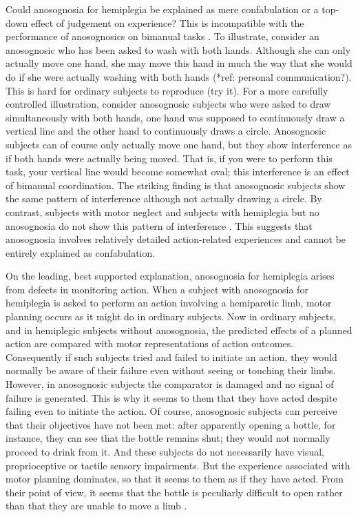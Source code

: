 \documentclass[12pt,\papersize]{extarticle}
\begin{document}
Could anosognosia for hemiplegia be explained as mere  confabulation or a top-down effect of judgement on experience?  This is incompatible with the performance of anosognosics on bimanual tasks \citep{berti:2008_motor, garbarini:2012_moving}.  To illustrate, consider an anosognosic who has been asked to wash with both hands.  Although she can only actually move one hand, she may move this hand in much the way that she would do if she were actually washing with both hands (*ref: personal communication?).  This is hard for ordinary subjects to reproduce (try it). For a more carefully controlled illustration, consider anosognosic subjects who were asked to draw simultaneously with both hands, one hand was supposed to continuously draw a vertical line and the other hand to continuously draws a circle.  Anosognosic subjects can of course only actually move one hand, but they show interference as if both hands were actually being moved.  That is, if you were to perform this task, your vertical line would become somewhat oval; this interference is an effect of bimanual coordination.  The striking finding is that anosognosic subjects show the same pattern of interference although not actually drawing a circle.  By contrast, subjects with motor neglect and subjects with hemiplegia but no anosognosia do not show this pattern of interference \citep{garbarini:2012_moving}.  This suggests that anosognosia involves relatively detailed action-related experiences and cannot be entirely explained as confabulation.  

On the leading, best supported explanation, anosognosia for hemiplegia arises from defects in monitoring action.  When a subject with anosognosia for hemiplegia is asked to perform an action involving a hemiparetic limb, motor planning occurs as it might do in ordinary subjects. Now in ordinary subjects, and in hemiplegic subjects without anosognosia, the predicted effects of a planned action are compared with motor representations of action outcomes.  Consequently if such subjects tried and failed to initiate an action, they would normally be aware of their failure even without seeing or touching their limbs. However, in anosognosic subjects the comparator is damaged and no signal of failure is generated.  This is why it seems to them that they have acted despite failing even to initiate the action.  Of course, anosognosic subjects can perceive that their objectives have not been met: after apparently opening a bottle, for instance, they can see that the bottle remains shut; they would not normally proceed to drink from it.  And these subjects do not necessarily have visual, proprioceptive or tactile sensory impairments.  But the experience associated with motor planning dominates, so that it seems to them as if they have acted.  From their point of view, it seems that the bottle is peculiarly difficult to open rather than that they are unable to move a limb \citep[pp.\ 173-4]{berti:2008_motor}.  
\end{document}
